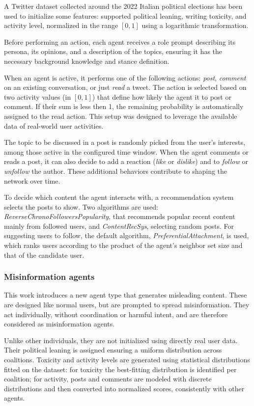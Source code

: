 A Twitter dataset collected around the 2022 Italian political elections \cite{pierri2023ita} has been used to initialize some features: supported political leaning, writing toxicity, and activity level, normalized in the range $[0,1]$ using a logarithmic transformation.

Before performing an action, each agent receives a role prompt describing its persona, its opinions, and a description of the topics, ensuring it has the necessary background knowledge and stance definition.


\medskip
When an agent is active, it performs one of the following actions: \textit{post}, \textit{comment} on an existing conversation, or just \textit{read} a tweet.
The action is selected based on two activity values (in $[0,1]$) that define how likely the agent it to post or comment.
If their sum is less then 1, the remaining probability is automatically assigned to the read action.
This setup was designed to leverage the available data of real-world user activities.

The topic to be discussed in a post is randomly picked from the user's interests, among those active in the configured time window.
When the agent comments or reads a post, it can also decide to add a reaction (\textit{like} or \textit{dislike}) and to \textit{follow} or \textit{unfollow} the author.
These additional behaviors contribute to shaping the network over time.

To decide which content the agent interacts with, a recommendation system selects the posts to show. Two algorithms are used: \textit{ReverseChronoFollowersPopularity}, that recommends popular recent content mainly from followed users, and \textit{ContentRecSys}, selecting random posts.
For suggesting users to follow, the default algorithm, \textit{PreferentialAttachment}, is used, which ranks users according to the product of the agent’s neighbor set size and that of the candidate user.


\subsubsection{Misinformation agents}
This work introduces a new agent type that generates misleading content.
These are designed like normal users, but are prompted to spread misinformation.
They act individually, without coordination or harmful intent, and are therefore considered as misinformation agents.

Unlike other individuals, they are not initialized using directly real user data.
Their political leaning is assigned ensuring a uniform distribution across coalitions.
Toxicity and activity levels are generated using statistical distributions fitted on the dataset: for toxicity the best-fitting distribution is identified per coalition; for activity, posts and comments are modeled with discrete distributions and then converted into normalized scores, consistently with other agents.


